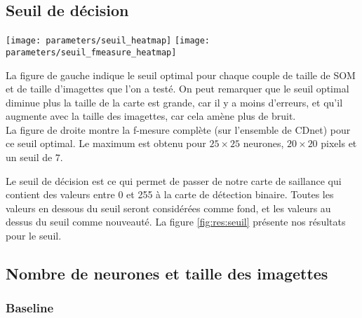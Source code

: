 	\subsection{Seuil de décision}

	\begin{figureth}
		\texttt{[image: parameters/seuil\_heatmap]}
		\texttt{[image: parameters/seuil\_fmeasure\_heatmap]}
		\caption[Seuil de décision]{La figure de gauche indique le seuil optimal pour chaque couple de taille de SOM et de taille d'imagettes que l'on a testé. On peut remarquer que le seuil optimal diminue plus la taille de la carte est grande, car il y a moins d'erreurs, et qu'il augmente avec la taille des imagettes, car cela amène plus de bruit.\\

		La figure de droite montre la f-mesure complète (sur l'ensemble de CDnet) pour ce seuil optimal. Le maximum est obtenu pour $25\times25$ neurones, $20\times20$ pixels et un seuil de $7$.}\label{fig:res:seuil}
	\end{figureth}

	Le seuil de décision est ce qui permet de passer de notre carte de saillance qui contient des valeurs entre 0 et 255 à la carte de détection binaire. Toutes les valeurs en dessous du seuil seront considérées comme fond, et les valeurs au dessus du seuil comme nouveauté. La figure \ref{fig:res:seuil} présente nos résultats pour le seuil.

	\subsection{Nombre de neurones et taille des imagettes}

	\subsubsection{Baseline}

